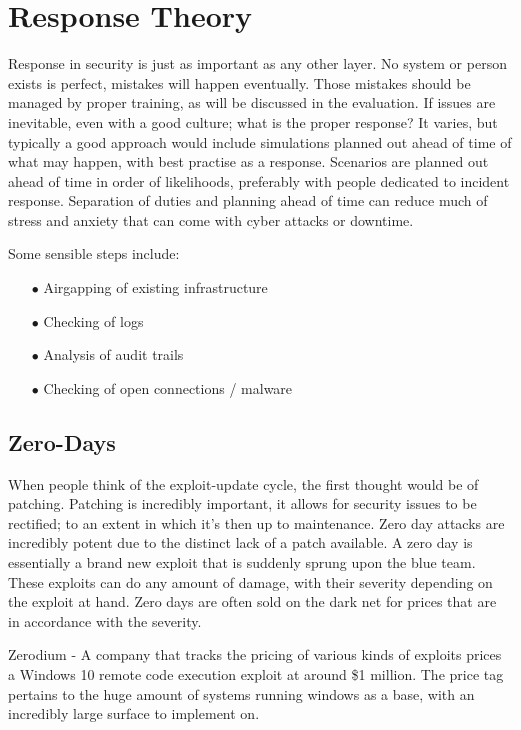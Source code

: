 
\section{Response Theory}
Response in security is just as important as any other layer. No system or person exists is perfect, mistakes will happen eventually. Those mistakes should be managed by proper training, as will be discussed in the evaluation.
If issues are inevitable, even with a good culture; what is the proper response? It varies, but typically a good approach would include simulations planned out ahead of time of what may happen, with best practise as a response.
Scenarios are planned out ahead of time in order of likelihoods, preferably with people dedicated to incident response. Separation of duties and planning ahead of time can reduce much of stress and anxiety that can come with cyber attacks or downtime.

Some sensible steps include:
\begin{enumerate}
    \item [$\bullet$] Airgapping of existing infrastructure
    \item [$\bullet$] Checking of logs
    \item [$\bullet$] Analysis of audit trails
    \item [$\bullet$] Checking of open connections / malware
\end{enumerate}


\subsection{Zero-Days}
When people think of the exploit-update cycle, the first thought would be of patching. Patching is incredibly important, it allows for security issues to be rectified; to an extent in which it's then up to maintenance. Zero day attacks are incredibly 
potent due to the distinct lack of a patch available. A zero day is essentially a brand new exploit that is suddenly sprung upon the blue team. These exploits can do any amount of damage, with their severity depending on the exploit at hand. 
Zero days are often sold on the dark net for prices that are in accordance with the severity. 

Zerodium - A company that tracks the pricing of various kinds of exploits prices a Windows 10 remote code execution exploit at around \$1 million. 
The price tag pertains to the huge amount of systems running windows as a base, with an incredibly large surface to implement on.


